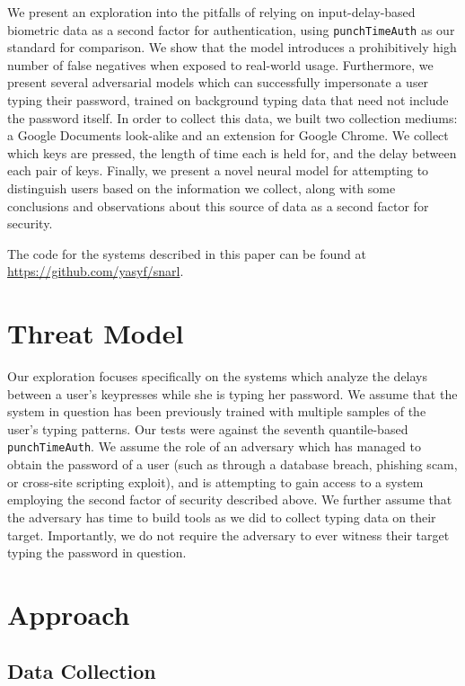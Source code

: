 \documentclass[9pt,journal]{IEEEtran}
\begin{document}
We present an exploration into the pitfalls of relying on input-delay-based biometric data as a second factor for authentication, using \texttt{punchTimeAuth} as our standard for comparison. We show that the model introduces a prohibitively high number of false negatives when exposed to real-world usage. Furthermore, we present several adversarial models which can successfully impersonate a user typing their password, trained on background typing data that need not include the password itself. In order to collect this data, we built two collection mediums: a Google Documents look-alike and an extension for Google Chrome. We collect which keys are pressed, the length of time each is held for, and the delay between each pair of keys. Finally, we present a novel neural model for attempting to distinguish users based on the information we collect, along with some conclusions and observations about this source of data as a second factor for security.

The code for the systems described in this paper can be found at \url{https://github.com/yasyf/snarl}.

\section{Threat Model}

Our exploration focuses specifically on the systems which analyze the delays between a user's keypresses while she is typing her password. We assume that the system in question has been previously trained with multiple samples of the user's typing patterns. Our tests were against the seventh quantile-based \texttt{punchTimeAuth}. We assume the role of an adversary which has managed to obtain the password of a user (such as through a database breach, phishing scam, or cross-site scripting exploit), and is attempting to gain access to a system employing the second factor of security described above. We further assume that the adversary has time to build tools as we did to collect typing data on their target. Importantly, we do not require the adversary to ever witness their target typing the password in question.

\section{Approach}
\subsection{Data Collection}
\end{document}

